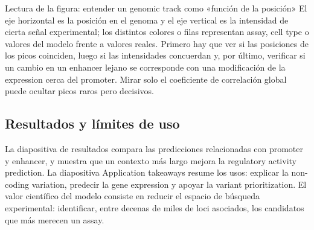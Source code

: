 
\begin{knowledgebox}{Lectura de la figura: entender un genomic track como «función de la posición»}
El eje horizontal es la posición en el genoma y el eje vertical es la intensidad de cierta señal experimental; los distintos colores o filas representan assay, cell type o valores del modelo frente a valores reales. Primero hay que ver si las posiciones de los picos coinciden, luego si las intensidades concuerdan y, por último, verificar si un cambio en un enhancer lejano se corresponde con una modificación de la expression cerca del promoter. Mirar solo el coeficiente de correlación global puede ocultar picos raros pero decisivos.
\end{knowledgebox}

\subsection{Resultados y límites de uso}

La diapositiva de resultados compara las predicciones relacionadas con promoter y enhancer, y muestra que un contexto más largo mejora la regulatory activity prediction. La diapositiva Application takeaways resume los usos: explicar la non-coding variation, predecir la gene expression y apoyar la variant prioritization. El valor científico del modelo consiste en reducir el espacio de búsqueda experimental: identificar, entre decenas de miles de loci asociados, los candidatos que más merecen un assay.




